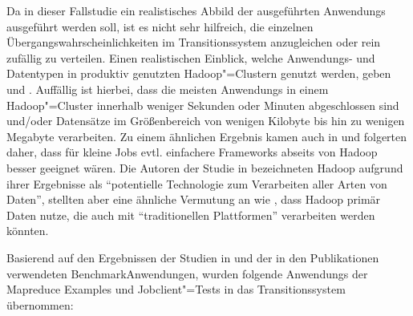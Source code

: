Da in dieser Fallstudie ein realistisches Abbild der ausgeführten \glspl{Anwendung} ausgeführt werden soll, ist es nicht sehr hilfreich, die einzelnen Übergangswahrscheinlichkeiten im Transitionssystem anzugleichen oder rein zufällig zu verteilen.
Einen realistischen Einblick, welche Anwendungs- und Datentypen in produktiv genutzten Hadoop"=Clustern genutzt werden, geben \uA \cite{Chen2012} und \cite{HadoopDataTypes}.
Auffällig ist hierbei, dass die meisten \glspl{Anwendung} in einem Hadoop"=Cluster innerhalb weniger Sekunden oder Minuten abgeschlossen sind und/oder Datensätze im Größenbereich von wenigen Kilobyte bis hin zu wenigen Megabyte verarbeiten.
Zu einem ähnlichen Ergebnis kamen auch \citeauthor{Ren2013} in \cite{Ren2013} und folgerten daher, dass für kleine Jobs evtl. einfachere Frameworks abseits von Hadoop besser geeignet wären.
Die Autoren der Studie in \cite{HadoopDataTypes} bezeichneten Hadoop aufgrund ihrer Ergebnisse als \enquote{potentielle Technologie zum Verarbeiten aller Arten von Daten}, stellten aber eine ähnliche Vermutung an wie \citeauthor{Ren2013}, dass Hadoop primär Daten nutze, die auch mit \enquote{traditionellen Plattformen} verarbeiten werden könnten.

Basierend auf den Ergebnissen der Studien in \cite{Huang2010,Chen2012,HadoopDataTypes,Ren2013} und der in den Publikationen \cite{Shvachko2010,Dean2004,Graves2013} verwendeten Benchmark\gls{Anwendung}en, wurden folgende \glspl{Anwendung} der Mapreduce Examples und Jobclient"=Tests in das Transitionssystem übernommen:

